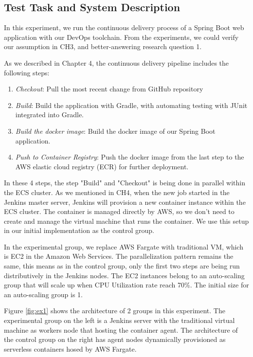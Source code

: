 \subsection{Test Task and System Description}
In this experiment, we run the continuous delivery process of a Spring Boot web application with our DevOps toolchain. From the experiments, we could verify our assumption in CH3, and better-answering research question 1.
\par
As we described in Chapter 4, the continuous delivery pipeline includes the following steps:
\begin{enumerate}
\item \textit{Checkout}: Pull the most recent change from GitHub repository
\item \textit{Build}: Build the application with Gradle, with automating testing with JUnit integrated into Gradle.
\item \textit{Build the docker image}: Build the docker image of our Spring Boot application.
\item \textit{Push to Container Registry}: Push the docker image from the last step to the AWS elastic cloud registry (ECR) for further deployment.
\end{enumerate}
\par
In these 4 steps, the step "Build" and "Checkout" is being done in parallel within the ECS cluster. As we mentioned in CH4, when the new job started in the Jenkins master server, Jenkins will provision a new container instance within the ECS cluster. The container is managed directly by AWS, so we don't need to create and manage the virtual machine that runs the container. We use this setup in our initial implementation as the control group.
\par
In the experimental group, we replace AWS Fargate with traditional VM, which is EC2 in the Amazon Web Services. The parallelization pattern remains the same, this means as in the control group, only the first two steps are being run distributively in the Jenkins nodes. The EC2 instances belong to an auto-scaling group that will scale up when CPU Utilization rate reach 70\%. The initial size for an auto-scaling group is 1.
\par
Figure \ref{fig:ex1} shows the architecture of 2 groups in this experiment. The experimental group on the left is a Jenkins server with the traditional virtual machine as workers node that hosting the container agent. The architecture of the control group on the right has agent nodes dynamically provisioned as serverless containers hosed by AWS Fargate.
